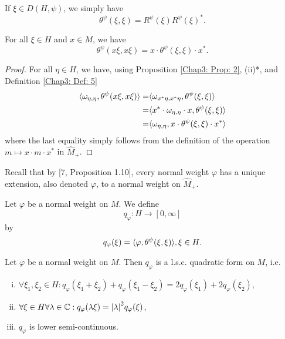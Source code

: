 \begin{remark}
    If $\xi\in D(H,\psi)$, we simply have
    \begin{equation}
        \theta^\psi(\xi,\xi)=R^\psi(\xi)R^\psi(\xi)^*.
    \end{equation}
\end{remark}
\begin{proposition}
    For all $\xi\in H$ and $x\in M$, we have
    \[
        \theta^\psi(x\xi,x\xi)=x\cdot \theta^\psi(\xi,\xi)\cdot x^*.
    \]
\end{proposition}
\begin{proof}
    For all $\eta\in H$, we have, using Proposition \ref{Chap3: Prop: 2}, (ii)*, and Definition \ref{Chap3: Def: 5}
    \[
        \begin{split}
            \langle\omega_{\eta,\eta},\theta^\psi(x\xi,x\xi)\rangle=&\langle\omega_{x^*\eta,x^*\eta},\theta^\psi(\xi,\xi)\rangle\\
            =&\langle x^*\cdot\omega_{\eta,\eta}\cdot x,\theta^\psi(\xi,\xi)\rangle\\
            =&\langle\omega_{\eta,\eta},x\cdot\theta^\psi(\xi,\xi)\cdot x^*\rangle
        \end{split}
    \]
    where the last equality simply follows from the definition of the operation $m\mapsto x\cdot m\cdot x^*$ in $\widehat{M}_+$.
\end{proof}
Recall that by [7, Proposition 1.10], every normal weight $\varphi$ has a unique extension, also denoted $\varphi$, to a normal weight on $\widehat{M}_+$.
\begin{definition}
    Let $\varphi$ be a normal weight on $M$. We define
    \[
        q_\varphi: H\to [0,\infty]
    \]
    by
    \begin{equation}
        q_\varphi(\xi)=\langle\varphi,\theta^\psi(\xi,\xi)\rangle, \xi\in H.
    \end{equation}
\end{definition}
\begin{proposition}
    Let $\varphi$ be a normal weight on $M$. Then $q_\varphi$ is a l.s.c. quadratic form on $M$, i.e.
    \begin{enumerate}[(i)]
        \item $\forall \xi_1,\xi_2\in H:q_\varphi(\xi_1+\xi_2)+q_\varphi(\xi_1-\xi_2)=2q_\varphi(\xi_1)+2q_\varphi(\xi_2)$,
        \item $\forall \xi\in H \forall \lambda\in \mathbb{C}: q_\varphi(\lambda \xi)=\abs{\lambda}^2q_\varphi(\xi)$,
        \item $q_\varphi$ is lower semi-continuous.
    \end{enumerate}
\end{proposition}
